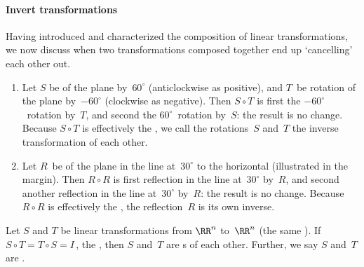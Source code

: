 \paragraph{Invert transformations}
Having introduced and characterized the composition of linear transformations, we now discuss when two transformations composed together end up `cancelling' each other out.

\begin{example} 
\begin{enumerate}
\item Let \(S\) be  of the plane by~\(60^\circ\) (anticlockwise as positive), and \(T\)~be rotation of the plane by~\(-60^\circ\) (clockwise as negative).
Then \(S\circ T\) is first the \(-60^\circ\)~rotation by~\(T\), and second the \(60^\circ\)~rotation by~\(S\): the result is no change.
Because \(S\circ T\) is effectively the , we call the rotations~\(S\) and~\(T\) the inverse transformation of each other.

\item Let \(R\)~be  of the plane in the line at~\(30^\circ\) to the horizontal (illustrated in the margin).  
%
Then \(R\circ R\) is first reflection in the line at~\(30^\circ\) by~\(R\), and second another reflection in the line at~\(30^\circ\) by~\(R\): the result is no change.
Because \(R\circ R\) is effectively the , the reflection~\(R\) is its own inverse.
\end{enumerate}
\end{example}



\begin{definition} \label{def:invLT} 
Let \(S\) and \(T\) be linear transformations from \(\RR^n\) to~\(\RR^n\) (the same ).
If \(S\circ T=T\circ S=I\)\,, the , then \(S\) and~\(T\) are s of each other.  
Further, we say \(S\) and~\(T\) are .
\end{definition}




